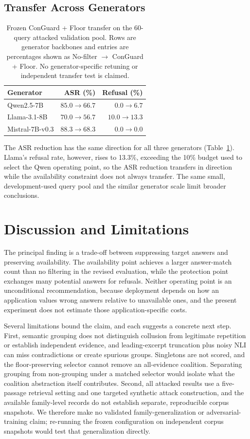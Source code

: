 \documentclass[sigconf]{aamas}
\begin{document}
\subsection{Transfer Across Generators}
\begin{table}[t]
\caption{Frozen ConGuard + Floor transfer on the 60-query attacked validation pool. Rows are generator backbones and entries are percentages shown as No-filter $\rightarrow$ ConGuard + Floor. No generator-specific retuning or independent transfer test is claimed.}
\label{tab:transfer}
\centering
\begin{tabular}{lrr}
\toprule
Generator & ASR (\%) & Refusal (\%)\\
\midrule
Qwen2.5-7B & $85.0\rightarrow66.7$ & $0.0\rightarrow6.7$\\
Llama-3.1-8B & $70.0\rightarrow56.7$ & $10.0\rightarrow13.3$\\
Mistral-7B-v0.3 & $88.3\rightarrow68.3$ & $0.0\rightarrow0.0$\\
\bottomrule
\end{tabular}
\end{table}
The ASR reduction has the same direction for all three generators (Table~\ref{tab:transfer}). Llama's refusal rate, however, rises to 13.3\%, exceeding the 10\% budget used to select the Qwen operating point, so the ASR reduction transfers in direction while the availability constraint does not always transfer. The same small, development-used query pool and the similar generator scale limit broader conclusions.

\section{Discussion and Limitations}
The principal finding is a trade-off between suppressing target answers and preserving availability. The availability point achieves a larger answer-match count than no filtering in the revised evaluation, while the protection point exchanges many potential answers for refusals. Neither operating point is an unconditional recommendation, because deployment depends on how an application values wrong answers relative to unavailable ones, and the present experiment does not estimate those application-specific costs.

Several limitations bound the claim, and each suggests a concrete next step. First, semantic grouping does not distinguish collusion from legitimate repetition or establish independent evidence, and leading-excerpt truncation plus noisy NLI can miss contradictions or create spurious groups. Singletons are not scored, and the floor-preserving selector cannot remove an all-evidence coalition. Separating grouping from non-grouping under a matched selector would isolate what the coalition abstraction itself contributes. Second, all attacked results use a five-passage retrieval setting and one targeted synthetic attack construction, and the available family-level records do not establish separate, reproducible corpus snapshots. We therefore make no validated family-generalization or adversarial-training claim; re-running the frozen configuration on independent corpus snapshots would test that generalization directly.
\end{document}
